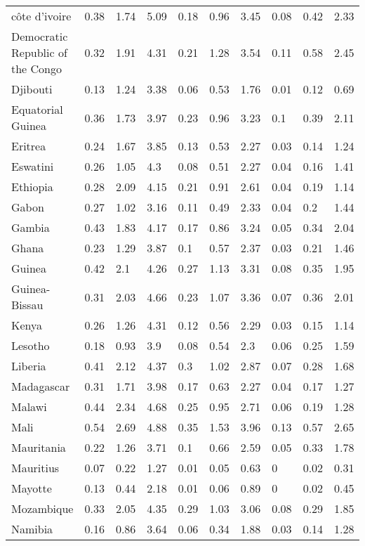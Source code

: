 \begin{longtable}[t]{llllllllll}
côte d'ivoire & 0.38 & 1.74 & 5.09 & 0.18 & 0.96 & 3.45 & 0.08 & 0.42 & 2.33\\
Democratic Republic of the Congo & 0.32 & 1.91 & 4.31 & 0.21 & 1.28 & 3.54 & 0.11 & 0.58 & 2.45\\
Djibouti & 0.13 & 1.24 & 3.38 & 0.06 & 0.53 & 1.76 & 0.01 & 0.12 & 0.69\\
Equatorial Guinea & 0.36 & 1.73 & 3.97 & 0.23 & 0.96 & 3.23 & 0.1 & 0.39 & 2.11\\
Eritrea & 0.24 & 1.67 & 3.85 & 0.13 & 0.53 & 2.27 & 0.03 & 0.14 & 1.24\\
Eswatini & 0.26 & 1.05 & 4.3 & 0.08 & 0.51 & 2.27 & 0.04 & 0.16 & 1.41\\
Ethiopia & 0.28 & 2.09 & 4.15 & 0.21 & 0.91 & 2.61 & 0.04 & 0.19 & 1.14\\
Gabon & 0.27 & 1.02 & 3.16 & 0.11 & 0.49 & 2.33 & 0.04 & 0.2 & 1.44\\
Gambia & 0.43 & 1.83 & 4.17 & 0.17 & 0.86 & 3.24 & 0.05 & 0.34 & 2.04\\
Ghana & 0.23 & 1.29 & 3.87 & 0.1 & 0.57 & 2.37 & 0.03 & 0.21 & 1.46\\
Guinea & 0.42 & 2.1 & 4.26 & 0.27 & 1.13 & 3.31 & 0.08 & 0.35 & 1.95\\
Guinea-Bissau & 0.31 & 2.03 & 4.66 & 0.23 & 1.07 & 3.36 & 0.07 & 0.36 & 2.01\\
Kenya & 0.26 & 1.26 & 4.31 & 0.12 & 0.56 & 2.29 & 0.03 & 0.15 & 1.14\\
Lesotho & 0.18 & 0.93 & 3.9 & 0.08 & 0.54 & 2.3 & 0.06 & 0.25 & 1.59\\
Liberia & 0.41 & 2.12 & 4.37 & 0.3 & 1.02 & 2.87 & 0.07 & 0.28 & 1.68\\
Madagascar & 0.31 & 1.71 & 3.98 & 0.17 & 0.63 & 2.27 & 0.04 & 0.17 & 1.27\\
Malawi & 0.44 & 2.34 & 4.68 & 0.25 & 0.95 & 2.71 & 0.06 & 0.19 & 1.28\\
Mali & 0.54 & 2.69 & 4.88 & 0.35 & 1.53 & 3.96 & 0.13 & 0.57 & 2.65\\
Mauritania & 0.22 & 1.26 & 3.71 & 0.1 & 0.66 & 2.59 & 0.05 & 0.33 & 1.78\\
Mauritius & 0.07 & 0.22 & 1.27 & 0.01 & 0.05 & 0.63 & 0 & 0.02 & 0.31\\
Mayotte & 0.13 & 0.44 & 2.18 & 0.01 & 0.06 & 0.89 & 0 & 0.02 & 0.45\\
Mozambique & 0.33 & 2.05 & 4.35 & 0.29 & 1.03 & 3.06 & 0.08 & 0.29 & 1.85\\
Namibia & 0.16 & 0.86 & 3.64 & 0.06 & 0.34 & 1.88 & 0.03 & 0.14 & 1.28\\

\end{longtable}
